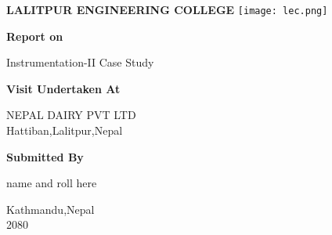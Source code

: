 \documentclass[12pt]{report}
\begin{document}
\begin{figure}[h]
\centering
{\fontsize{16pt}{10}\textbf{\MakeUppercase{lalitpur engineering college}}}
\vspace{2mm}
\texttt{[image: lec.png]}
\vspace{2mm}

\begin{center}
{\fontsize{16pt}{10}\textbf{Report on}\\}
\end{center}
\vspace{1mm}
Instrumentation-II Case Study
\vspace{6mm}

\begin{center}
{\fontsize{16pt}{10}\textbf{Visit Undertaken At}}
\vspace{1mm}
\end{center}
\MakeUppercase{nepal dairy pvt ltd}\\
Hattiban,Lalitpur,Nepal
\vspace{6mm}

\begin{center}
{\fontsize{16pt}{10}\textbf{Submitted By}}
\vspace{1mm}
\end{center}
name and roll here
\vspace{6mm}

Kathmandu,Nepal\\
\vspace{10mm}
2080


\end{figure}

\date{July 2023}
\end{document}
